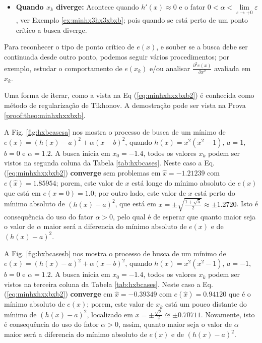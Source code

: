 \begin{theorem}
\begin{itemize}
\item \textbf{Quando $x_{k}$ diverge:}  
Acontece quando $h'(x) \approx 0$ e o fator $0<\alpha<\lim\limits_{\varepsilon \rightarrow +0}\varepsilon$, 
ver Exemplo \ref{ex:minhx3hx3xbxb}; pois quando se está perto
de um ponto crítico a busca diverge. \\
\end{itemize}

Para reconhecer o tipo de ponto crítico de $e(x)$, e souber se 
a busca debe ser continuada desde outro ponto, 
podemos seguir vários procedimentos; por exemplo, estudar o comportamento 
de $e(x_k)$ e/ou analisar  $\frac{\partial^2 e(x)}{\partial x^2}$ avaliada em $x_k$.

Uma forma de iterar, como a vista na Eq (\ref{eq:minhxhxxbxb2}) é conhecida como 
método de regularização de Tikhonov.
A demostração pode ser vista na Prova \ref{proof:theo:minhxhxxbxb}.
\end{theorem}




\begin{example}\label{ex:minhxhxxbxb}
 A Fig. \ref{fig:hxbcasesa} nos mostra o processo de busca de um mínimo
 de $e(x)=(h(x)-a)^2+\alpha (x-b)^2$, quando $h(x)=x^2(x^2-1)$, $a=1$, $b=0$ e $\alpha=1.2$. A busca inicia em $x_0=-1.4$,
 todos os valores $x_{k}$ podem ser vistos na segunda coluna da
Tabela \ref{tab:hxbcases}. Neste caso a Eq. (\ref{eq:minhxhxxbxb2}) \textbf{converge} sem problemas 
em $\hat{x}=-1.21239$ com $e(\hat{x})=1.85954$; porem, 
 este valor de $x$ está longe do mínimo
 absoluto de  $e(x)$ que está em $e(x=0)=1.0$; por outro lado, este valor de $x$
 está perto do mínimo absoluto de  $(h(x)-a)^2$, que está em 
 $x=\pm\sqrt{\frac{1+\sqrt{5}}{2}}\approx \pm1.2720$. Isto é consequência do uso do fator 
 $\alpha>0$, pelo qual é de esperar que quanto maior seja o valor de $\alpha$
 maior será a diferencia do mínimo absoluto de $e(x)$ e de $(h(x)-a)^2$.

 A Fig. \ref{fig:hxbcasesb} nos mostra o processo de busca de um mínimo
 de $e(x)=(h(x)-a)^2+\alpha (x-b)^2$, quando $h(x)=x^2(x^2-1)$, $a=-1$, $b=0$ e $\alpha=1.2$. A busca inicia em $x_0=-1.4$,
 todos os valores $x_{k}$ podem ser vistos na terceira coluna da
Tabela \ref{tab:hxbcases}. Neste caso a Eq. (\ref{eq:minhxhxxbxb2}) \textbf{converge} 
em $\hat{x}=-0.39349$ com $e(\hat{x})=0.94120$ que é o mínimo absoluto de $e(x)$; porem, este valor de $x_k$ está
um pouco distante do mínimo de $(h(x)-a)^2$, localizado em $x=\pm\frac{\sqrt{2}}{2}\approxeq \pm0.70711$.
Novamente, isto é consequência do uso do fator 
 $\alpha>0$, assim, quanto maior seja o valor de $\alpha$
 maior será a diferencia do mínimo absoluto de $e(x)$ e de $(h(x)-a)^2$.

\end{example}


